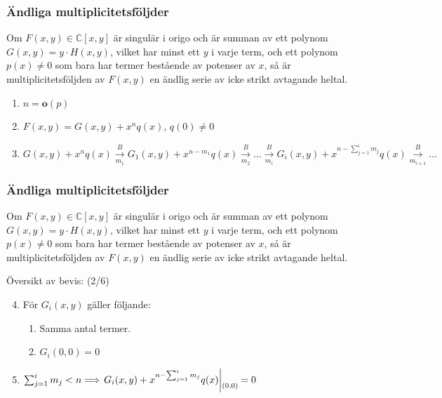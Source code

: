 \documentclass{beamer}
\begin{document}
\begin{frame}
	\frametitle{Ändliga multiplicitetsföljder}
	\begin{Theorem}
		Om $F(x,y)\in \mathbb{C}[x,y]$ är singulär i origo och är summan av ett polynom $G(x,y)=y\cdot H(x,y)$, vilket har minst ett $y$ i varje term, och ett polynom $p(x) \neq 0$ som bara har termer bestående av potenser av $x$, så är multiplicitetsföljden av $F(x,y)$ en ändlig serie av icke strikt avtagande heltal.
	\end{Theorem}

	\begin{enumerate}
		\item<3->$n=\mathbf{o}(p)$
		\item<4->$F(x,y)=G(x,y)+x^nq(x)$, $q(0)\neq 0$
		\item<5->$
		G(x,y)+x^nq(x) \overset{B}{\underset{m_1}{\longrightarrow}} G_1(x,y)+x^{n-m_1}q(x) \overset{B}{\underset{m_2}{\longrightarrow}} \ldots \overset{B}{\underset{m_i}{\longrightarrow}}
		G_i(x,y)+x^{n-\sum_{j=1}^{i}m_j}q(x) \overset{B}{\underset{m_{i+1}}{\longrightarrow}} \ldots$
	\end{enumerate}
\end{frame}

\begin{frame}
	\frametitle{Ändliga multiplicitetsföljder}
	\begin{Theorem}
		Om $F(x,y)\in \mathbb{C}[x,y]$ är singulär i origo och är summan av ett polynom $G(x,y)=y\cdot H(x,y)$, vilket har minst ett $y$ i varje term, och ett polynom $p(x) \neq 0$ som bara har termer bestående av potenser av $x$, så är multiplicitetsföljden av $F(x,y)$ en ändlig serie av icke strikt avtagande heltal.
	\end{Theorem}
			
	Översikt av bevis: (2/6)
	\begin{enumerate}
		\setcounter{enumi}{3}
		\item För $G_i(x,y)$ gäller följande:
		\begin{enumerate}
			\item<2-> Samma antal termer.
			\item<3-> $G_i(0,0)=0$
		\end{enumerate}
		\item<4-> $\sum_{j=1}^{i}m_j<n \Longrightarrow \left.G_i(x,y)+x^{n-\sum_{j=1}^{i}m_j}q(x) \middle|\raisebox{-0.5 em}{\scriptsize(0,0)}=0\right.$
	\end{enumerate}
\end{frame}
\end{document}
